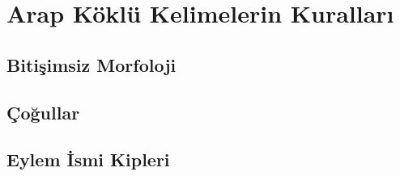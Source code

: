 
\chapter{Arap Köklü Kelimelerin Kuralları}
\section{Bitişimsiz Morfoloji}

\section{Çoğullar}

\section{Eylem İsmi Kipleri}


